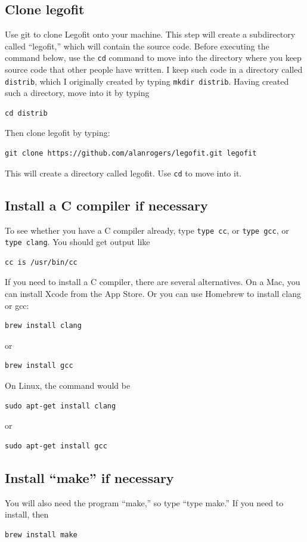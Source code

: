 \documentclass[11pt]{article}
\begin{document}
\subsection{Clone legofit}
Use git to clone Legofit onto your machine. This step will create a
subdirectory called ``legofit,'' which will contain the source
code. Before executing the command below, use the \texttt{cd} command
to move into the directory where you keep source code that other
people have written. I keep such code in a directory called
\texttt{distrib}, which I originally created by typing \texttt{mkdir
  distrib}. Having created such a directory, move into it by typing
\begin{verbatim}
cd distrib
\end{verbatim}
Then clone legofit by typing:
\begin{verbatim}
git clone https://github.com/alanrogers/legofit.git legofit
\end{verbatim}
This will create a directory called legofit. Use \texttt{cd} to move into it.

\subsection{Install a C compiler if necessary}
To see whether you have a C compiler already, type \texttt{type cc},
or \texttt{type gcc}, or \texttt{type clang}. You should get output like
\begin{verbatim}
cc is /usr/bin/cc
\end{verbatim}
If you need to install a C compiler, there are several
alternatives. On a Mac, you can install Xcode from the App Store. Or
you can use Homebrew to install clang or gcc:
\begin{verbatim}
brew install clang
\end{verbatim}
or
\begin{verbatim}
brew install gcc
\end{verbatim}
On Linux, the command would be
\begin{verbatim}
sudo apt-get install clang
\end{verbatim}
or
\begin{verbatim}
sudo apt-get install gcc
\end{verbatim}

\subsection{Install ``make'' if necessary}
You will also need the program ``make,'' so type ``type make.'' If you
need to install, then
\begin{verbatim}
brew install make
\end{verbatim}
\end{document}
